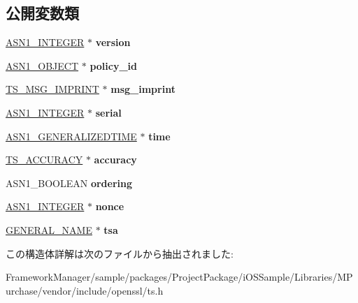 \subsection*{公開変数類}
\begin{DoxyCompactItemize}
\item 
\hypertarget{struct_t_s__tst__info__st_ad0e7ab1536c6e4ecae58bc6f0538b4dc}{}\hyperlink{structasn1__string__st}{A\+S\+N1\+\_\+\+I\+N\+T\+E\+G\+E\+R} $\ast$ {\bfseries version}\label{struct_t_s__tst__info__st_ad0e7ab1536c6e4ecae58bc6f0538b4dc}

\item 
\hypertarget{struct_t_s__tst__info__st_a59787f93711b76c27283f254d4a767b3}{}\hyperlink{structasn1__object__st}{A\+S\+N1\+\_\+\+O\+B\+J\+E\+C\+T} $\ast$ {\bfseries policy\+\_\+id}\label{struct_t_s__tst__info__st_a59787f93711b76c27283f254d4a767b3}

\item 
\hypertarget{struct_t_s__tst__info__st_adae22a923e0d2be1b9b42a1b65ad6421}{}\hyperlink{struct_t_s__msg__imprint__st}{T\+S\+\_\+\+M\+S\+G\+\_\+\+I\+M\+P\+R\+I\+N\+T} $\ast$ {\bfseries msg\+\_\+imprint}\label{struct_t_s__tst__info__st_adae22a923e0d2be1b9b42a1b65ad6421}

\item 
\hypertarget{struct_t_s__tst__info__st_ab450625d8b03f76e3382e5f3b6a35896}{}\hyperlink{structasn1__string__st}{A\+S\+N1\+\_\+\+I\+N\+T\+E\+G\+E\+R} $\ast$ {\bfseries serial}\label{struct_t_s__tst__info__st_ab450625d8b03f76e3382e5f3b6a35896}

\item 
\hypertarget{struct_t_s__tst__info__st_a8b6a1201796f7e1b5b961ee86ab55681}{}\hyperlink{structasn1__string__st}{A\+S\+N1\+\_\+\+G\+E\+N\+E\+R\+A\+L\+I\+Z\+E\+D\+T\+I\+M\+E} $\ast$ {\bfseries time}\label{struct_t_s__tst__info__st_a8b6a1201796f7e1b5b961ee86ab55681}

\item 
\hypertarget{struct_t_s__tst__info__st_a4ffba57649f2c0e48348a2c2894de46b}{}\hyperlink{struct_t_s__accuracy__st}{T\+S\+\_\+\+A\+C\+C\+U\+R\+A\+C\+Y} $\ast$ {\bfseries accuracy}\label{struct_t_s__tst__info__st_a4ffba57649f2c0e48348a2c2894de46b}

\item 
\hypertarget{struct_t_s__tst__info__st_a4410b2d0d0f5ebc631a41804c0a92ad8}{}A\+S\+N1\+\_\+\+B\+O\+O\+L\+E\+A\+N {\bfseries ordering}\label{struct_t_s__tst__info__st_a4410b2d0d0f5ebc631a41804c0a92ad8}

\item 
\hypertarget{struct_t_s__tst__info__st_af2de206a30ac43b6c0048e1b78774ca4}{}\hyperlink{structasn1__string__st}{A\+S\+N1\+\_\+\+I\+N\+T\+E\+G\+E\+R} $\ast$ {\bfseries nonce}\label{struct_t_s__tst__info__st_af2de206a30ac43b6c0048e1b78774ca4}

\item 
\hypertarget{struct_t_s__tst__info__st_aa4b23c96f4a2a053c56b46f7622a4a2c}{}\hyperlink{struct_g_e_n_e_r_a_l___n_a_m_e__st}{G\+E\+N\+E\+R\+A\+L\+\_\+\+N\+A\+M\+E} $\ast$ {\bfseries tsa}\label{struct_t_s__tst__info__st_aa4b23c96f4a2a053c56b46f7622a4a2c}

\end{DoxyCompactItemize}


この構造体詳解は次のファイルから抽出されました\+:\begin{DoxyCompactItemize}
\item 
Framework\+Manager/sample/packages/\+Project\+Package/i\+O\+S\+Sample/\+Libraries/\+M\+Purchase/vendor/include/openssl/ts.\+h\end{DoxyCompactItemize}
